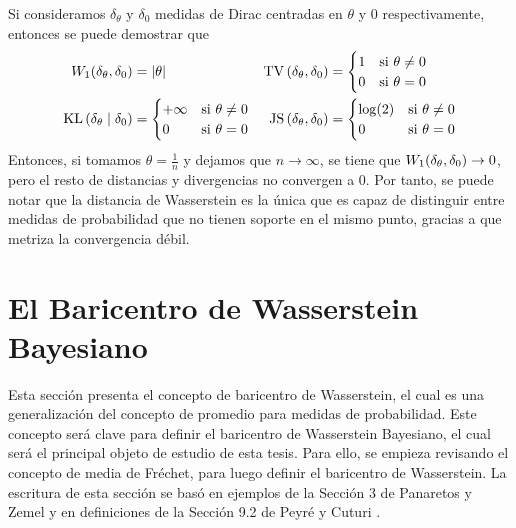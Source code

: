 {{\begin{example}
			Si consideramos $\delta_\theta$ y $\delta_0$ medidas de Dirac centradas en $\theta$ y $0$ respectivamente, entonces se puede demostrar que
			\begin{align*}
				\Wasserstein[1]{\delta_\theta}{\delta_0} & = |\theta|                            &
				\TV{\delta_\theta}{\delta_0}             & = \begin{cases}
					                                             1 & \text{si } \theta \neq 0 \\
					                                             0 & \text{si } \theta = 0
				                                             \end{cases}          \\
				\KL{\delta_\theta}{\delta_0}             & = \begin{cases}
					                                             +\infty & \text{si } \theta \neq 0 \\
					                                             0       & \text{si } \theta = 0
				                                             \end{cases} &
				\JS{\delta_\theta}{\delta_0}             & = \begin{cases}
					                                             \log(2) & \text{si } \theta \neq 0 \\
					                                             0       & \text{si } \theta = 0
				                                             \end{cases}
			\end{align*}
			Entonces, si tomamos $\theta = \frac{1}{n} $ y dejamos que $n \to \infty$, se tiene que $\Wasserstein[1]{\delta_\theta}{\delta_0} \to 0$, pero el resto de distancias y divergencias no convergen a 0.
			Por tanto, se puede notar que la distancia de Wasserstein es la única que es capaz de distinguir entre medidas de probabilidad que no tienen soporte en el mismo punto, gracias a que metriza la convergencia débil.
		\end{example}

	}  %

	\section{El Baricentro de Wasserstein Bayesiano}\label{sec:el-baricentro-de-Wasserstein-Bayesiano}
	{
		Esta sección presenta el concepto de baricentro de Wasserstein, el cual es una generalización del concepto de promedio para medidas de probabilidad. Este concepto será clave para definir el baricentro de Wasserstein Bayesiano, el cual será el principal objeto de estudio de esta tesis. Para ello, se empieza revisando el concepto de media de Fréchet, para luego definir el baricentro de Wasserstein. La escritura de esta sección se basó en ejemplos de la Sección 3 de Panaretos y Zemel \cite{panaretos2020invitation} y en definiciones de la Sección 9.2 de Peyré y Cuturi \cite{peyre2019computational}.

}}
